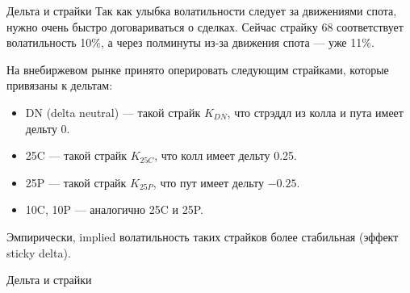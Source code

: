 \documentclass{beamer}
\begin{document}
\begin{frame}{Дельта и страйки}
\justify
Так как улыбка волатильности следует за движениями спота, нужно очень быстро договариваться о сделках. Сейчас страйку 68 соответствует волатильность 10\%, а через полминуты из-за движения спота --- уже 11\%.

\justify
На внебиржевом рынке принято оперировать следующим страйками, которые привязаны к дельтам:
\begin{itemize}
\item DN (delta neutral) --- такой страйк $K_{DN}$, что стрэддл из колла и пута имеет дельту 0.
\item 25C --- такой страйк $K_{25C}$, что колл имеет дельту 0.25.
\item 25P --- такой страйк $K_{25P}$, что пут имеет дельту $-0.25$.
\item 10C, 10P --- аналогично 25C и 25P.
\end{itemize}

\justify
Эмпирически, implied волатильность таких страйков более стабильная (эффект sticky delta).
\end{frame}



\newcommand{\drawVolNode}[4] {

	\node[
		circle,
		color=Set1-B,
		fill,
		inner sep=2pt
	] at (#1, #2) {};
	
	\node[anchor=#4] at (#1, #2) {$\sigma_{#3}$};
}

\begin{frame}{Дельта и страйки}
\centering
{}
\end{frame}
\end{document}
